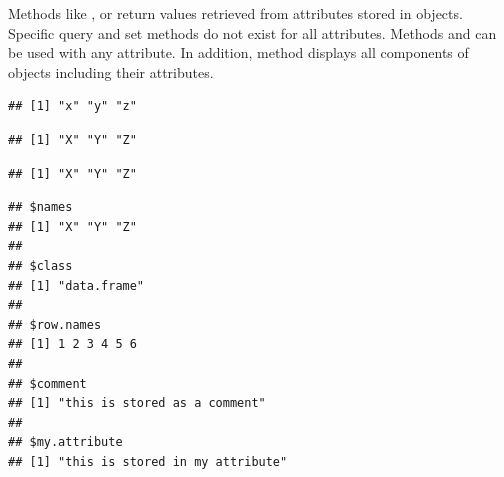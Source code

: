 \documentclass[krantz2]{krantz}\usepackage{knitr}%
\begin{document}
Methods like ,  or  return values retrieved from attributes stored in \Rlang objects. Specific query and set methods do not exist for all attributes. Methods  and  can be used with any attribute. In addition, method  displays all components of \Rlang objects including their attributes.

\begin{knitrout}\footnotesize
{}\color{fgcolor}\begin{kframe}
\begin{alltt}
\end{alltt}
\begin{verbatim}
## [1] "x" "y" "z"
\end{verbatim}
\begin{alltt}
 \hlkwb{<-} \hlstd{(}
\end{alltt}
\begin{verbatim}
## [1] "X" "Y" "Z"
\end{verbatim}
\begin{alltt}
 \hlstd{)} 
\end{alltt}
\begin{verbatim}
## [1] "X" "Y" "Z"
\end{verbatim}
\begin{alltt}
 \hlstd{)} \hlkwb{<-} 
\end{alltt}
\begin{verbatim}
## $names
## [1] "X" "Y" "Z"
## 
## $class
## [1] "data.frame"
## 
## $row.names
## [1] 1 2 3 4 5 6
## 
## $comment
## [1] "this is stored as a comment"
## 
## $my.attribute
## [1] "this is stored in my attribute"
\end{verbatim}
\end{kframe}
\end{knitrout}
\end{document}
